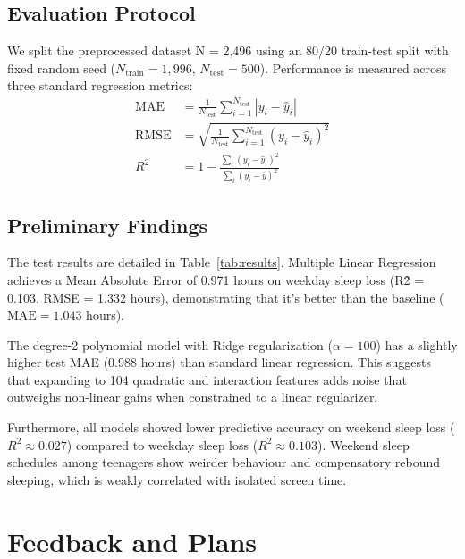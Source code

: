 \documentclass[11pt]{article}
\begin{document}
\subsection{Evaluation Protocol}
We split the preprocessed dataset N = 2,496 using an 80/20 train-test split with fixed random seed ($N_{\text{train}} = 1{,}996$, $N_{\text{test}} = 500$). Performance is measured across three standard regression metrics:
\begin{align}
    \text{MAE} &= \frac{1}{N_{\text{test}}} \sum_{i=1}^{N_{\text{test}}} |y_i - \hat{y}_i| \\
    \text{RMSE} &= \sqrt{\frac{1}{N_{\text{test}}} \sum_{i=1}^{N_{\text{test}}} (y_i - \hat{y}_i)^2} \\
    R^2 &= 1 - \frac{\sum_{i} (y_i - \hat{y}_i)^2}{\sum_i (y_i - \bar{y})^2}
\end{align}

\subsection{Preliminary Findings}
The test results are detailed in Table~\ref{tab:results}. Multiple Linear Regression achieves a Mean Absolute Error of 0.971 hours on weekday sleep loss (R\^2 = 0.103, RMSE = 1.332 hours), demonstrating that it's better than the baseline ($\text{MAE} = 1.043$ hours).

The degree-2 polynomial model with Ridge regularization ($\alpha = 100$) has a slightly higher test MAE ($0.988$ hours) than standard linear regression. This suggests that expanding to 104 quadratic and interaction features adds noise that outweighs non-linear gains when constrained to a linear regularizer. 

Furthermore, all models showed lower predictive accuracy on weekend sleep loss ($R^2 \approx 0.027$) compared to weekday sleep loss ($R^2 \approx 0.103$). Weekend sleep schedules among teenagers show weirder behaviour and compensatory rebound sleeping, which is weakly correlated with isolated screen time.

\section{Feedback and Plans}
\end{document}
